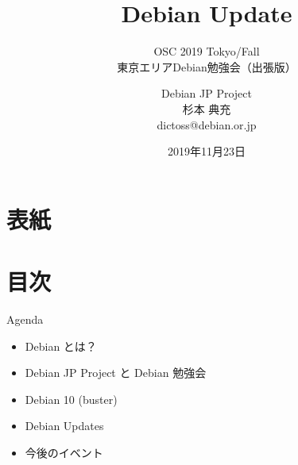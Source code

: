 \title{Debian Update}
\subtitle{OSC 2019 Tokyo/Fall \\東京エリアDebian勉強会（出張版）}
\author{Debian JP Project \\杉本 典充\\ dictoss@debian.or.jp}
\date{2019年11月23日}




\section{表紙}

\begin{frame}
\titlepage{}
\end{frame}

\section{目次}

\begin{frame}{Agenda}
  \begin{itemize}
  \item Debian とは？
  \item Debian JP Project と Debian 勉強会
  \item Debian 10 (buster)
  \item Debian Updates
  \item 今後のイベント
  \end{itemize}
\end{frame}

